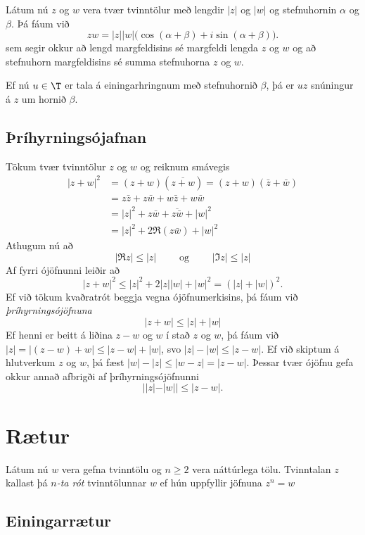 Látum nú $z$ og $w$ vera tvær tvinntölur með lengdir 
$|z|$ og $|w|$ og stefnuhornin $\alpha$ og $\beta$.
Þá fáum við
$$
zw=|z||w|\big(\cos(\alpha+\beta)+i\sin(\alpha+\beta)\big).
$$
sem segir okkur að lengd margfeldisins sé 
margfeldi lengda $z$ og $w$ og  
að stefnuhorn margfeldisins sé summa stefnuhorna $z$  og $w$.

Ef nú $u\in \T$ er tala á einingarhringnum með stefnuhornið
$\beta$, þá er $uz$ snúningur á $z$ um hornið $\beta$.


\subsection*{Þríhyrningsójafnan}

Tökum tvær tvinntölur $z$ og $w$ og reiknum smávegis
\begin{align*}
|z+w|^2&=(z+w)(\overline{z+w})=(z+w)(\bar z+\bar w)  \\
 &=z\bar z+z\bar w+w\bar z+w\bar w\\
&=|z|^2+z\bar w+\overline{z\bar w}+|w|^2\\
&=|z|^2+2\Re(z\bar w)+|w|^2
\end{align*}
Athugum nú að
$$
|\Re z|\leq |z| \qquad \text{ og } \qquad 
|\Im z|\leq |z|
$$
Af fyrri ójöfnunni  leiðir að
$$
|z+w|^2\leq |z|^2+2|z||w|+|w|^2=(|z|+|w|)^2.
$$
Ef við tökum kvaðratrót beggja vegna ójöfnumerkisins, þá fáum við
{\it þríhyrningsójöfnuna}
$$
|z+w|\leq |z|+|w|
$$
Ef henni er beitt á liðina $z-w$ og $w$ í stað $z$ og $w$, þá fáum við
$|z|=|(z-w)+w|\leq |z-w|+|w|$, svo $|z|-|w|\leq |z-w|$.
Ef við skiptum á hlutverkum $z$ og $w$, þá fæst
$|w|-|z|\leq |w-z|=|z-w|$. Þessar tvær ójöfnu gefa okkur
annað afbrigði af þríhyrningsójöfnunni
$$
||z|-|w||\leq |z-w|.
$$

\section{Rætur}

Látum nú $w$ vera gefna tvinntölu og $n\geq 2$ vera náttúrlega tölu.
Tvinntalan $z$ kallast þá  {\it $n$-ta  rót} tvinntölunnar $w$ ef hún
uppfyllir jöfnuna $z^n=w$

\subsection*{Einingarrætur}


